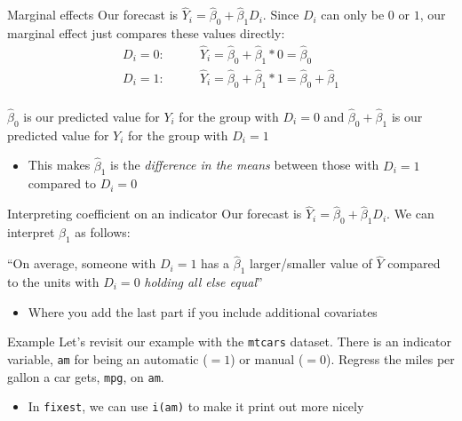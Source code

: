 \documentclass[aspectratio=169,t,11pt,table]{beamer}
\begin{document}
\begin{frame}{Marginal effects}
  Our forecast is $\hat{Y}_i = \hat{\beta}_0 + \hat{\beta}_1 D_i$. Since $D_i$ can only be $0$ or $1$, our marginal effect just compares these values directly:
  \begin{align*}
    D_i = 0: &\quad\quad \hat{Y}_i = \hat{\beta}_0 + \hat{\beta}_1 * 0 = \hat{\beta}_0 \\
    D_i = 1: &\quad\quad \hat{Y}_i = \hat{\beta}_0 + \hat{\beta}_1 * 1 = \hat{\beta}_0 + \hat{\beta}_1 \\
  \end{align*}

  $\hat{\beta}_0$ is our predicted value for $Y_i$ for the group with $D_i = 0$ and $\hat{\beta}_0 + \hat{\beta}_1$ is our predicted value for $Y_i$ for the group with $D_i = 1$ 
  \begin{itemize}
    \item This makes $\hat{\beta}_1$ is the \emph{difference in the means} between those with $D_i = 1$ compared to $D_i = 0$
  \end{itemize}
\end{frame}

\begin{frame}{Interpreting coefficient on an indicator}
  Our forecast is $\hat{Y}_i = \hat{\beta}_0 + \hat{\beta}_1 D_i$. We can interpret $\hat{\beta}_1$ as follows:

  \begin{tcolorbox}[boxrule = 0pt, frame hidden, sharp corners, enhanced, borderline west = {2pt}{0pt}{zinc600}, interior hidden]
    ``On average, someone with $D_i = 1$ has a $\hat{\beta}_1$ larger/smaller value of $\hat{Y}$ compared to the units with $D_i = 0$ \emph{\color{blue} holding all else equal}''
  \end{tcolorbox}

  \begin{itemize}
    \item Where you add the last part if you include additional covariates
  \end{itemize}
\end{frame}

\begin{frame}{Example}
  Let's revisit our example with the \texttt{mtcars} dataset. There is an indicator variable, \texttt{am} for being an automatic ($= 1$) or manual ($= 0$). 
  Regress the miles per gallon a car gets, \texttt{mpg}, on \texttt{am}.

  \begin{itemize}
    \item In \texttt{fixest}, we can use \texttt{i(am)} to make it print out more nicely
  \end{itemize}
\end{frame}
 
\end{document}
